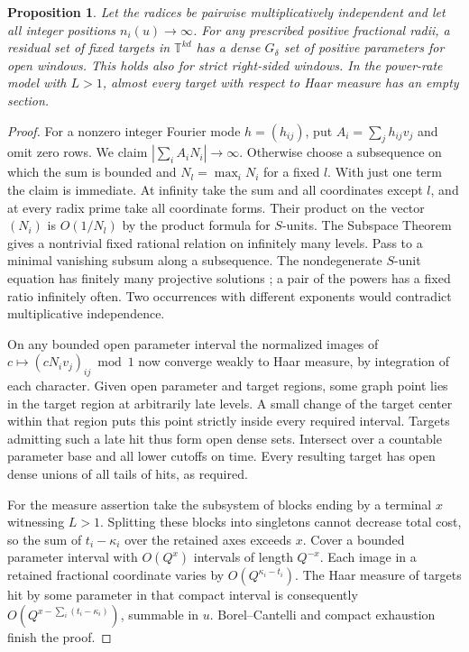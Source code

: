 \documentclass[11pt,reqno,a4paper]{amsart}
\newtheorem{proposition}[theorem]{Proposition}
\theoremstyle{remark}
\numberwithin{equation}{section}
\begin{document}
\begin{proposition}\label{prop:category}
Let the radices be pairwise multiplicatively independent and let all integer positions \(n_i(u)\to\infty\). For any prescribed positive fractional radii, a residual set of fixed targets in \(\mathbb T^{kd}\) has a dense \(G_\delta\) set of positive parameters for open windows. This holds also for strict right-sided windows. In the power-rate model with \(L>1\), almost every target with respect to Haar measure has an empty section.
\end{proposition}
\begin{proof}
For a nonzero integer Fourier mode \(h=(h_{ij})\), put \(A_i=\sum_jh_{ij}v_j\) and omit zero rows. We claim \(|\sum_i A_iN_i|\to\infty\). Otherwise choose a subsequence on which the sum is bounded and \(N_l=\max_iN_i\) for a fixed \(l\). With just one term the claim is immediate. At infinity take the sum and all coordinates except \(l\), and at every radix prime take all coordinate forms. Their product on the vector \((N_i)\) is \(O(1/N_l)\) by the product formula for \(S\)-units. The Subspace Theorem gives a nontrivial fixed rational relation on infinitely many levels. Pass to a minimal vanishing subsum along a subsequence. The nondegenerate \(S\)-unit equation has finitely many projective solutions \cite[Theorem~1.1]{ESS}; a pair of the powers has a fixed ratio infinitely often. Two occurrences with different exponents would contradict multiplicative independence.

On any bounded open parameter interval the normalized images of \(c\mapsto (cN_iv_j)_{ij}\bmod1\) now converge weakly to Haar measure, by integration of each character. Given open parameter and target regions, some graph point lies in the target region at arbitrarily late levels. A small change of the target center within that region puts this point strictly inside every required interval. Targets admitting such a late hit thus form open dense sets. Intersect over a countable parameter base and all lower cutoffs on time. Every resulting target has open dense unions of all tails of hits, as required.

For the measure assertion take the subsystem of blocks ending by a terminal \(x\) witnessing \(L>1\). Splitting these blocks into singletons cannot decrease total cost, so the sum of \(t_i-\kappa_i\) over the retained axes exceeds \(x\). Cover a bounded parameter interval with \(O(Q^x)\) intervals of length \(Q^{-x}\). Each image in a retained fractional coordinate varies by \(O(Q^{\kappa_i-t_i})\). The Haar measure of targets hit by some parameter in that compact interval is consequently
\(O(Q^{x-\sum_i(t_i-\kappa_i)})\), summable in \(u\). Borel--Cantelli and compact exhaustion finish the proof.
\end{proof}
\end{document}
